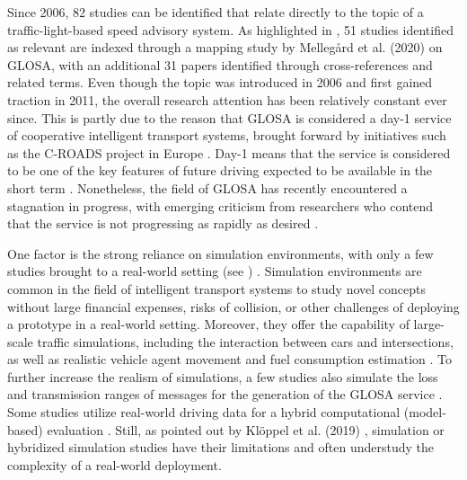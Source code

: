 Since 2006, 82 studies can be identified that relate directly to the topic of a traffic-light-based speed advisory system. As highlighted in , 51 studies identified as relevant are indexed through a mapping study by Mellegård et al. (2020) \cite{mellegard_day_2020} on GLOSA, with an additional 31 papers identified through cross-references and related terms. Even though the topic was introduced in 2006 and first gained traction in 2011, the overall research attention has been relatively constant ever since. This is partly due to the reason that GLOSA is considered a day-1 service of cooperative intelligent transport systems, brought forward by initiatives such as the C-ROADS project in Europe \cite{sharara_impact_2019}. Day-1 means that the service is considered to be one of the key features of future driving expected to be available in the short term \cite{mellegard_day_2020}. Nonetheless, the field of GLOSA has recently encountered a stagnation in progress, with emerging criticism from researchers who contend that the service is not progressing as rapidly as desired \cite{mellegard_day_2020, otto_framework_2023}.

One factor is the strong reliance on simulation environments, with only a few studies brought to a real-world setting (see ) \cite{mellegard_day_2020}. Simulation environments are common in the field of intelligent transport systems to study novel concepts without large financial expenses, risks of collision, or other challenges of deploying a prototype in a real-world setting. Moreover, they offer the capability of  large-scale traffic simulations, including the interaction between cars and intersections, as well as realistic vehicle agent movement and fuel consumption estimation \cite{kloeppel_performance_2019, pariota_green_2019}. To further increase the realism of simulations, a few studies also simulate the loss and transmission ranges of messages for the generation of the GLOSA service \cite{sharara_impact_2019}. Some studies utilize real-world driving data for a hybrid computational (model-based) evaluation \cite{raubitschek_predictive_2011, luo_green_2017, xie_dynamic_2021, bhattacharyya_assessing_2022}. Still, as pointed out by Klöppel et al. (2019) \cite{kloeppel_performance_2019}, simulation or hybridized simulation studies have their limitations and often understudy the complexity of a real-world deployment.

